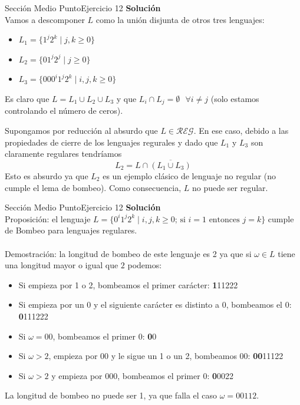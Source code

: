 \documentclass[10pt, envcountsect, presentation, aspectratio=169]{beamer}
\begin{document}

\begin{frame}{Sección Medio Punto}{Ejercicio 12}
    \textbf{Solución}\\
    Vamos a descomponer $L$ como la unión disjunta de otros tres lenguajes:
    \begin{itemize}
        \item $L_1 = \{ 1^j2^k \mid j,k \geq 0 \}$
        \item $L_2 = \{ 01^j2^j \mid j \geq 0 \}$
        \item $L_3 = \{ 000^i 1^j 2^k \mid i,j,k \geq0\}$
    \end{itemize}
    Es claro que $L = L_1 \cup L_2 \cup L_3$ y que $L_i \cap L_j = \emptyset \text{ } \forall i \neq j$ (solo estamos controlando el número de ceros).
    
    Supongamos por reducción al absurdo que $L \in \mathcal{REG}$. En ese caso, debido a las propiedades de cierre de los lenguajes regurales y dado que $L_1$ y $L_3$ son claramente regulares tendríamos 
    $$L_2 = L \cap \overline{(L_1 \cup L_3)}$$
    Esto es absurdo ya que $L_2$ es un ejemplo clásico de lenguaje no regular (no cumple el lema de bombeo).
    Como consecuencia, $L$ no puede ser regular.
\end{frame}


\begin{frame}{Sección Medio Punto}{Ejercicio 12}
    \textbf{Solución}\\
    Proposición: el lenguaje $L= \{ 0^i 1^j 2^k \mid i,j,k \geq0 \mbox{; si } i=1 \mbox{ entonces } j=k \} $ cumple de Bombeo para lenguajes regulares.\\~\\

    Demostración: la longitud de bombeo de este lenguaje es 2 ya que si $\omega \in L$ tiene una longitud mayor o igual que $2$ podemos:
    \begin{itemize}
        \item Si empieza por 1 o 2, bombeamos el primer carácter: \textbf{1}11222
        \item Si empieza por un 0 y el siguiente carácter es distinto a 0, bombeamos el 0: \textbf{0}111222
        \item Si $\omega = 00$, bombeamos el primer 0: \textbf{0}0
        \item Si $\omega>2$, empieza por 00 y le sigue un 1 o un 2, bombeamos 00: \textbf{00}11122
        \item Si $\omega>2$ y empieza por 000, bombeamos el primer 0: \textbf{0}0022
    \end{itemize}
    La longitud de bombeo no puede ser 1, ya que falla el caso $\omega = 00112$.
\end{frame}
\end{document}
